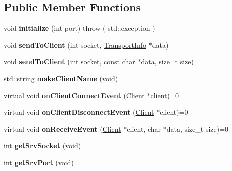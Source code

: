 \subsection*{Public Member Functions}
\begin{DoxyCompactItemize}
\item 
\mbox{\label{classServer_1_1ServerInterface_a3013119f068a5f66b41bbedf695a144a}} 
void {\bfseries initialize} (int port)  throw ( std\+::exception )
\item 
\mbox{\label{classServer_1_1ServerInterface_aae229bc7178b95cf45d46cecfd30607a}} 
void {\bfseries send\+To\+Client} (int socket, \hyperlink{classAlexaEvent_1_1TransportInfo}{Transport\+Info} $\ast$data)
\item 
\mbox{\label{classServer_1_1ServerInterface_af7df3bc716ad249702114baa9349f624}} 
void {\bfseries send\+To\+Client} (int socket, const char $\ast$data, size\+\_\+t size)
\item 
\mbox{\label{classServer_1_1ServerInterface_a3dee51a5771ec859c12d181b17cc3580}} 
std\+::string {\bfseries make\+Client\+Name} (void)
\item 
\mbox{\label{classServer_1_1ServerInterface_af98a8efb11c55a9e0f8c3e5e3626a927}} 
virtual void {\bfseries on\+Client\+Connect\+Event} (\hyperlink{classServer_1_1Client}{Client} $\ast$client)=0
\item 
\mbox{\label{classServer_1_1ServerInterface_a340d6ca49a8a515b4f1714cd7b8996c2}} 
virtual void {\bfseries on\+Client\+Disconnect\+Event} (\hyperlink{classServer_1_1Client}{Client} $\ast$client)=0
\item 
\mbox{\label{classServer_1_1ServerInterface_a0b1d7a0c99bb435b5c22abbf75269b90}} 
virtual void {\bfseries on\+Receive\+Event} (\hyperlink{classServer_1_1Client}{Client} $\ast$client, char $\ast$data, size\+\_\+t size)=0
\item 
\mbox{\label{classServer_1_1ServerInterface_a39ca36342b5d93f834c7923628e9b7a4}} 
int {\bfseries get\+Srv\+Socket} (void)
\item 
\mbox{\label{classServer_1_1ServerInterface_acdf8db44eb86e7f96d9eb1ae431a67de}} 
int {\bfseries get\+Srv\+Port} (void)
\end{DoxyCompactItemize}


